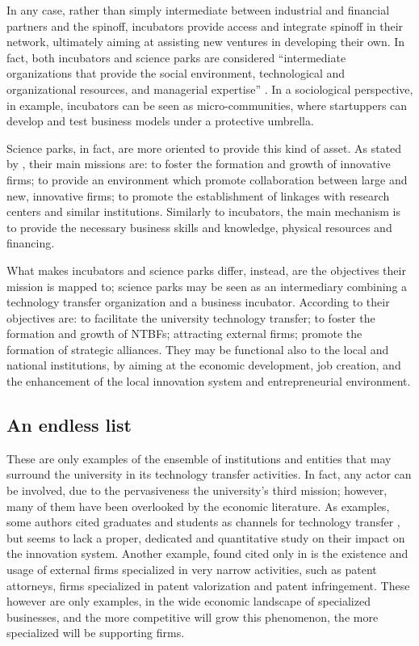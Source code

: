 In any case, rather than simply intermediate between industrial and financial partners and the spinoff, incubators provide access and integrate spinoff in their network, ultimately aiming at assisting new ventures in developing their own. In fact, both incubators and science parks are considered \enquote{intermediate organizations that provide the social environment, technological and organizational resources, and managerial expertise} \citep{Phan2005}. In a sociological perspective, in example, incubators can be seen as micro-communities, where startuppers can develop and test business models under a protective umbrella. 

Science parks, in fact, are more oriented to provide this kind of asset. As stated by \citet{Siegel2003}, their main missions are: to foster the formation and growth of innovative firms; to provide an environment which promote collaboration between large and new, innovative firms; to promote the establishment of linkages with research centers and similar institutions. Similarly to incubators, the main mechanism is to provide the necessary business skills and knowledge, physical resources and financing.

What makes incubators and science parks differ, instead, are the objectives their mission is mapped to; science parks may be seen as an intermediary combining a technology transfer organization and a business incubator. According to \citet{Siegel2003} their objectives are: to facilitate the university technology transfer; to foster the formation and growth of NTBFs; attracting external firms; promote the formation of strategic alliances. They may be functional also to the local and national institutions, by aiming at the economic development, job creation, and the enhancement of the local innovation system and entrepreneurial environment. 

\subsection{An endless list}

These are only examples of the ensemble of institutions and entities that may surround the university in its technology transfer activities. In fact, any actor can be involved, due to the pervasiveness the university's third mission; however, many of them have been overlooked by the economic literature. As examples, some authors cited graduates and students as channels for technology transfer \citep{Segal1986, Audretsch2004,OShea2005,Guerrero2014}, but seems to lack a proper, dedicated and quantitative study on their impact on the innovation system. Another example, found cited only in \citet{Balderi2010} is the existence and usage of external firms specialized in very narrow activities, such as patent attorneys, firms specialized in patent valorization and patent infringement. These however are only examples, in the wide economic landscape of specialized businesses, and the more competitive will grow this phenomenon, the more specialized will be supporting firms. 
